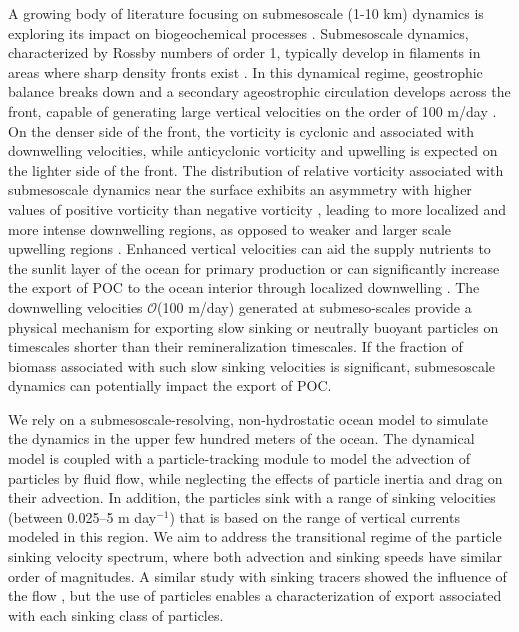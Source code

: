 \documentclass[article,linenumbers]{agujournal2019}
\begin{document}
	A growing body of literature focusing on submesoscale (1-10 km) dynamics is exploring its impact on biogeochemical processes \cite{Levy_2012, Mahadevan_2016}. Submesoscale dynamics, characterized by Rossby numbers of order 1, typically develop in filaments in areas where sharp density fronts exist \cite{Thomas_2013b,Klein_2009,McWilliams_2016}. In this dynamical regime, geostrophic balance breaks down and a secondary ageostrophic circulation develops across the front, capable of generating large vertical velocities on the order of 100 m/day \cite{FoxKemper_2008,Mahadevan_2016}. On the denser side of the front, the vorticity is cyclonic and associated with downwelling velocities, while anticyclonic vorticity and upwelling is expected on the lighter side of the front. The distribution of relative vorticity associated with submesoscale dynamics near the surface exhibits an asymmetry with higher values of positive vorticity than negative vorticity \cite{Rudnick_2001}, leading to more localized and more intense downwelling regions, as opposed to weaker and larger scale upwelling regions \cite{Mahadevan_2006}. Enhanced vertical velocities can aid the supply nutrients to the sunlit layer of the ocean for primary production \cite{Mahadevan_2000,Levy_2001} or can significantly increase the export of POC to the ocean interior through localized downwelling \cite{Levy_2012, Gruber_2011,Estapa_2015,Omand_2015}. The downwelling velocities $\mathcal{O}$(100 m/day) generated at submeso-scales provide a physical mechanism for exporting slow sinking or neutrally buoyant particles on timescales shorter than their remineralization timescales. If the fraction of  biomass associated with such slow sinking velocities is significant, submesoscale dynamics can potentially impact the export of POC.

	We  rely on a submesoscale-resolving, non-hydrostatic  ocean model to simulate the dynamics in the upper few hundred meters of the ocean. The dynamical model is coupled with a particle-tracking module to model the advection of particles by fluid flow, while neglecting the effects of particle inertia and drag on their advection. In addition, the particles sink with a range of sinking velocities (between 0.025--5 m day$^{-1}$) that is based on the range of vertical currents modeled in this region. We aim to address the transitional regime of the particle sinking velocity spectrum, where both advection and sinking speeds have similar order of magnitudes. A similar study with sinking tracers  showed the influence of the flow \cite{Taylor_2020}, but the use of particles enables a characterization of export associated with each sinking class of particles.
\end{document}
